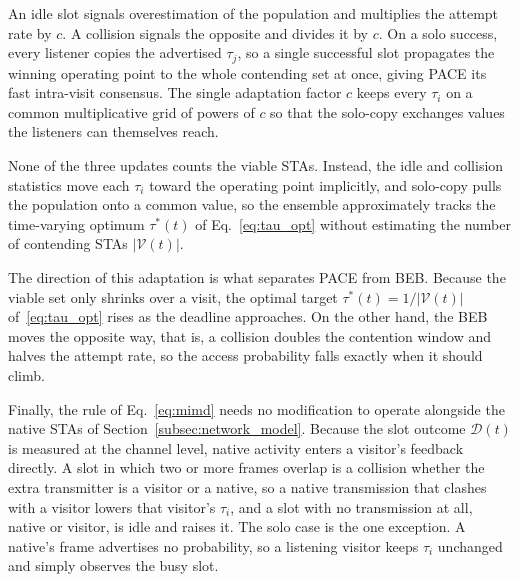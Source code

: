 \documentclass[journal,10pt]{IEEEtran}
\begin{document}
An idle slot signals overestimation of the population and multiplies the attempt rate by $c$. A collision signals the opposite and divides it by $c$. On a solo success, every listener copies the advertised $\tau_j$, so a single successful slot propagates the winning operating point to the whole contending set at once, giving PACE its fast intra-visit consensus. The single adaptation factor $c$ keeps every $\tau_i$ on a common multiplicative grid of powers of $c$ so that the solo-copy exchanges values the listeners can themselves reach.

None of the three updates counts the viable STAs. Instead, the idle and collision statistics move each $\tau_i$ toward the operating point implicitly, and solo-copy pulls the population onto a common value, so the ensemble approximately tracks the time-varying optimum $\tau^*(t)$ of Eq.~\eqref{eq:tau_opt} without estimating the number of contending STAs $|\mathcal{V}(t)|$. 

The direction of this adaptation is what separates PACE from BEB. Because the viable set only shrinks over a visit, the optimal target $\tau^*(t)=1/|\mathcal{V}(t)|$ of~\eqref{eq:tau_opt} rises as the deadline approaches. On the other hand, the BEB moves the opposite way, that is, a collision doubles the contention window and halves the attempt rate, so the access probability falls exactly when it should climb.

Finally, the rule of Eq.~\eqref{eq:mimd} needs no modification to operate alongside the native STAs of Section~\ref{subsec:network_model}. Because the slot outcome $\mathcal{D}(t)$ is measured at the channel level, native activity enters a visitor's feedback directly. A slot in which two or more frames overlap is a collision whether the extra transmitter is a visitor or a native, so a native transmission that clashes with a visitor lowers that visitor's $\tau_i$, and a slot with no transmission at all, native or visitor, is idle and raises it. The solo case is the one exception. A native's frame advertises no probability, so a listening visitor keeps $\tau_i$ unchanged and simply observes the busy slot.

\end{document}
